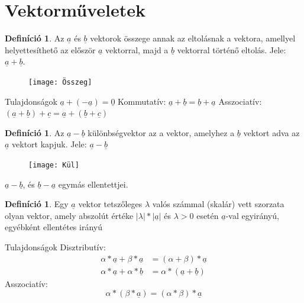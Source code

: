 \documentclass[twoside,12pt]{report}
\renewcommand{\vec}{\underline}
\theoremstyle{definition}
\newtheorem{definition}[theorem]{Definíció}
\begin{document}
\section{Vektorműveletek}
	\begin{definition}
		Az $\vec{a}$ és $\vec{b}$ vektorok összege annak az eltolásnak a vektora, amellyel helyettesíthető az először $\vec{a}$ vektorral, majd a $\vec{b}$ vektorral történő eltolás. Jele: $\vec{a}+\vec{b}$.
	\end{definition}
	\begin{figure}[H]
		\centering
		\texttt{[image: Összeg]}
	\end{figure}
	\begin{outline}
		\1 Tulajdonságok
			\2 $\vec{a}+(-\vec{a})=\vec{0}$
			\2 Kommutatív: $\vec{a}+\vec{b}=\vec{b}+\vec{a}$
			\2 Asszociatív: $(\vec{a}+\vec{b})+\vec{c}=\vec{a}+(\vec{b}+\vec{c})$
	\end{outline}
	\begin{definition}
		Az $\vec{a}-\vec{b}$ különbségvektor az a vektor, amelyhez a $\vec{b}$ vektort adva az $\vec{a}$ vektort kapjuk. Jele: $\vec{a}-\vec{b}$
	\end{definition}
	\begin{figure}[H]
		\centering
		\texttt{[image: Kül]}
	\end{figure}
	$\vec{a}-\vec{b}$, és $\vec{b}-\vec{a}$ egymás ellentettjei.
	\begin{definition}
		Egy $\vec{a}$ vektor tetszőleges $\lambda$ valós számmal (skalár) vett szorzata olyan vektor, amely abszolút értéke $|\lambda|*|\vec{a}|$ és $\lambda>0$ esetén $\vec{a}$-val egyirányú, egyébként ellentétes irányú
	\end{definition}
	\begin{outline}
		\1 Tulajdonságok
			\2 Disztributív: 
			\begin{align*}
				\alpha*\vec{a}+\beta*\vec{a}&=(\alpha+\beta)*\vec{a}\\
				\alpha*\vec{a}+\alpha*\vec{b}&=\alpha*(\vec{a}+\vec{b})
			\end{align*}
			\2 Asszociatív: 
			\begin{equation*}
				\alpha*(\beta*\vec{a})=(\alpha*\beta)*\vec{a}
			\end{equation*}
	\end{outline}
\end{document}
